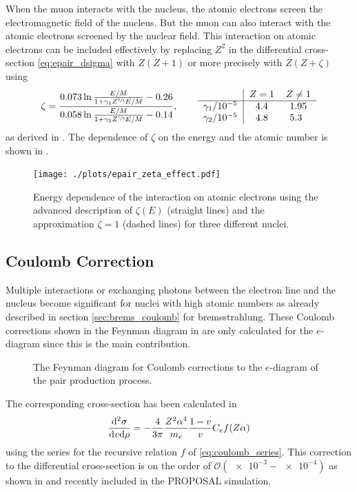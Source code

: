 When the muon interacts with the nucleus, the atomic electrons screen the electromagnetic field of the nucleus.
But the muon can also interact with the atomic electrons screened by the nuclear field.
This interaction on atomic electrons can be included effectively by replacing $Z^2$ in the differential cross-section \eqref{eq:epair_dsigma} with $Z(Z+1)$ or more precisely with $Z(Z+\zeta)$ using
\begin{align}
    \zeta = \frac{0.073 \logn \frac{E/M}{1 + \gamma_1 Z^{\sfrac23}E/M} - 0.26}{0.058 \logn \frac{E/M}{1 + \gamma_2 Z^{\sfrac13}E/M} - 0.14},
    \qquad
    \begin{tabular}{r | S[table-format=1.1] S[table-format=1.2]}
        & {$Z = 1$} & {$Z \neq 1$} \\ \hline
        $\gamma_1/10^{-5}$ & 4.4 & 1.95 \\
        $\gamma_2/10^{-5}$ & 4.8 & 5.3
    \end{tabular}
\end{align}
as derived in \cite{Kelner98}. The dependence of $\zeta$ on the energy and the atomic number is shown in .
\begin{figure}
    \centering
    \texttt{[image: ./plots/epair\_zeta\_effect.pdf]}
    \caption{Energy dependence of the interaction on atomic electrons using the advanced description of $\zeta(E)$ (straight lines) and the approximation $\zeta=1$ (dashed lines) for three different nuclei.}
    \label{fig:epair_zeta}
\end{figure}

\subsection{Coulomb Correction}

Multiple interactions or exchanging photons between the electron line and the nucleus become significant for nuclei with high atomic numbers as already described in section \ref{sec:brems_coulomb} for bremsstrahlung.
These Coulomb corrections shown in the Feynman diagram in  are only calculated for the $e$-diagram since this is the main contribution.
\begin{figure}
    \centering
    
    \caption{The Feynman diagram for Coulomb corrections to the $e$-diagram of the pair production process.}
    \label{fig:feyn_epair_coulomb}
\end{figure}

The corresponding cross-section has been calculated in \cite{Ivanov98photon, Ivanov98muon}
\begin{align}
    \frac{\mathrm{d}^2 \sigma}{\mathrm{d} v \mathrm{d} \rho} =
        - \frac{4}{3\pi} \frac{Z^2\alpha^4}{m_e} \frac{1-v}{v} C_e f(Z\alpha)
\end{align}
using the series for the recursive relation $f$ of \eqref{eq:coulomb_series}.
This correction to the differential cross-section is on the order of $\mathcal{O}(\num{e-3} - \num{e-4})$ as shown in  and recently included in the PROPOSAL simulation.

